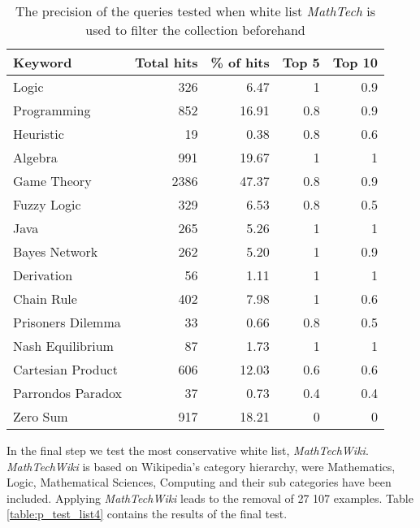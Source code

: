 \begin{table}[H]
\centering
\begin{tabular} {|| p{10em} | r | r | r | r ||} 
 \hline
 Keyword & Total hits & \% of hits & Top 5 & Top 10 \\ [0.5ex] 
 \hline

Logic & 326 & 6.47 & 1 & 0.9 \\
Programming & 852 & 16.91 & 0.8 & 0.9 \\
Heuristic & 19 & 0.38 & 0.8 & 0.6 \\
Algebra & 991 & 19.67 & 1 & 1 \\
Game Theory & 2386 & 47.37 & 0.8 & 0.9 \\
\hline
Fuzzy Logic & 329 & 6.53 & 0.8 & 0.5 \\
Java & 265 & 5.26 & 1 & 1 \\
Bayes Network & 262 & 5.20 & 1 & 0.9 \\
Derivation & 56 & 1.11 & 1 & 1 \\
\hline
Chain Rule & 402 & 7.98 & 1 & 0.6 \\
Prisoners Dilemma & 33 & 0.66 & 0.8 & 0.5 \\
Nash Equilibrium & 87 & 1.73 & 1 & 1 \\
Cartesian Product & 606 & 12.03 & 0.6 & 0.6 \\
Parrondos Paradox & 37 & 0.73 & 0.4 & 0.4 \\
Zero Sum & 917 & 18.21 & 0 & 0 \\

 \hline
\end{tabular}
\caption{The precision of the queries tested when white list \textit{MathTech} is used to filter the collection beforehand}
\label{table:p_test_list3}
\end{table}

In the final step we test the most conservative white list, \textit{MathTechWiki}. \textit{MathTechWiki} is based on Wikipedia's category hierarchy, were Mathematics, Logic, Mathematical Sciences, Computing and their sub categories have been included. Applying \textit{MathTechWiki} leads to the removal of 27 107 examples. Table \ref{table:p_test_list4} contains the results of the final test. 

